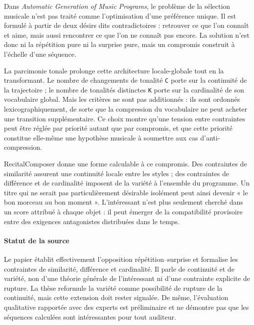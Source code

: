 \documentclass[10pt,a4paper]{article}
\begin{document}
Dans \emph{Automatic Generation of Music Programs}, le problème de la sélection musicale n'est pas traité comme l'optimisation d'une préférence unique. Il est formulé à partir de deux désirs dits contradictoires : retrouver ce que l'on connaît et aime, mais aussi rencontrer ce que l'on ne connaît pas encore. La solution n'est donc ni la répétition pure ni la surprise pure, mais un compromis construit à l'échelle d'une séquence.

La parcimonie tonale prolonge cette architecture locale-globale tout en la transformant. Le nombre de changements de tonalité \texttt{C} porte sur la continuité de la trajectoire ; le nombre de tonalités distinctes \texttt{K} porte sur la cardinalité de son vocabulaire global. Mais les critères ne sont pas additionnés : ils sont ordonnés lexicographiquement, de sorte que la compression du vocabulaire ne peut acheter une transition supplémentaire. Ce choix montre qu'une tension entre contraintes peut être réglée par priorité autant que par compromis, et que cette priorité constitue elle-même une hypothèse musicale à soumettre aux cas d'anti-compression.

RecitalComposer donne une forme calculable à ce compromis. Des contraintes de similarité assurent une continuité locale entre les styles ; des contraintes de différence et de cardinalité imposent de la variété à l'ensemble du programme. Un titre qui ne serait pas particulièrement désirable isolément peut ainsi devenir « le bon morceau au bon moment ». L'intéressant n'est plus seulement cherché dans un score attribué à chaque objet : il peut émerger de la compatibilité provisoire entre des exigences antagonistes distribuées dans le temps.

\paragraph{Statut de la source}
Le papier établit effectivement l'opposition répétition--surprise et formalise les contraintes de similarité, différence et cardinalité. Il parle de continuité et de variété, non d'une théorie générale de l'intéressant ni d'une contrainte explicite de rupture. La thèse reformule la variété comme possibilité de rupture de la continuité, mais cette extension doit rester signalée. De même, l'évaluation qualitative rapportée avec des experts est préliminaire et ne démontre pas que les séquences calculées sont intéressantes pour tout auditeur.
\end{document}
